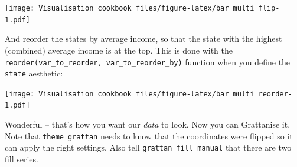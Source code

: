 \documentclass[]{book}
\newenvironment{Shaded}{\begin{snugshade}}{\end{snugshade}}
\newcommand{\CommentTok}[1]{\textcolor[rgb]{0.56,0.35,0.01}{\textit{#1}}}
\newcommand{\DataTypeTok}[1]{\textcolor[rgb]{0.13,0.29,0.53}{#1}}
\newcommand{\DecValTok}[1]{\textcolor[rgb]{0.00,0.00,0.81}{#1}}
\newcommand{\KeywordTok}[1]{\textcolor[rgb]{0.13,0.29,0.53}{\textbf{#1}}}
\newcommand{\NormalTok}[1]{#1}
\newcommand{\OperatorTok}[1]{\textcolor[rgb]{0.81,0.36,0.00}{\textbf{#1}}}
\newcommand{\OtherTok}[1]{\textcolor[rgb]{0.56,0.35,0.01}{#1}}
\newcommand{\StringTok}[1]{\textcolor[rgb]{0.31,0.60,0.02}{#1}}
\begin{document}
\texttt{[image: Visualisation\_cookbook\_files/figure-latex/bar\_multi\_flip-1.pdf]}

And reorder the states by average income, so that the state with the highest (combined) average income is at the top. This is done with the \texttt{reorder(var\_to\_reorder,\ var\_to\_reorder\_by)} function when you define the \texttt{state} aesthetic:

\begin{Shaded}
\end{Shaded}

\texttt{[image: Visualisation\_cookbook\_files/figure-latex/bar\_multi\_reorder-1.pdf]}

Wonderful -- that's how you want our \emph{data} to look. Now you can Grattanise it. Note that \texttt{theme\_grattan} needs to know that the coordinates were flipped so it can apply the right settings. Also tell \texttt{grattan\_fill\_manual} that there are two fill series.

\begin{Shaded}
\end{Shaded}
\end{document}
